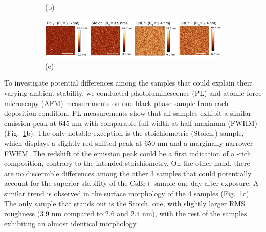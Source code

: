 \begin{figure}[htbp]
\begin{subfigure}[t]{0.45\textwidth}
        \caption*{(b)}
    \end{subfigure}

    \begin{subfigure}[t]{0.99\textwidth}
        \centering
        \includegraphics[width=\textwidth]{chapters/stability/imeges/Stability_Rotation_Stoich_AFM.pdf} %
        \caption*{(c)}
    \end{subfigure}

    \caption{}
    \label{fig:stability:stoichiomtries_rotation}
\end{figure}

To investigate potential differences among the samples that could explain their varying ambient stability, we conducted photoluminescence (PL) and atomic force microscopy (AFM) measurements on one black-phase sample from each deposition condition. PL measurements show that all samples exhibit a similar emission peak at 645 nm with comparable full width at half-maximum (FWHM) (Fig.~\ref{fig:stability:stoichiomtries_rotation}b). The only notable exception is the stoichiometric (Stoich.) sample, which displays a slightly red-shifted peak at 650 nm and a marginally narrower FWHM. The redshift of the emission peak could be a first indication of a -rich composition, contrary to the intended stoichiometry. On the other hand, there are no discernible differences among the other 3 samples that could potentially account for the superior stability of the CsBr+ sample one day after exposure. A similar trend is observed in the surface morphology of the 4 samples (Fig.~\ref{fig:stability:stoichiomtries_rotation}c). The only sample that stands out is the Stoich. one, with slightly larger RMS roughness (3.9 nm compared to 2.6 and 2.4 nm), with the rest of the samples exhibiting an almost identical morphology. 


